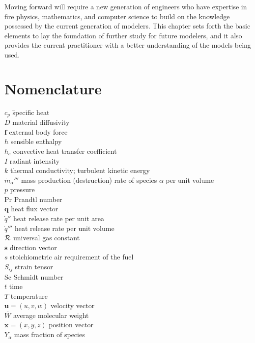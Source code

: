 \documentclass[graybox]{svmult}
\begin{document}
Moving forward will require a new generation of engineers who have expertise in fire physics, mathematics, and computer science to build on the knowledge possessed by the current generation of modelers. This chapter sets forth the basic elements to lay the foundation of further study for future modelers, and it also provides the current practitioner with a better understanding of the models being used.



\section{Nomenclature}

\begin{tabbing}
$c_p$ 	\hspace{1in}     \= specific heat \\
$D$	                     \> material diffusivity \\
$\mathbf{f}$	         \> external body force \\
$h$                      \>	sensible enthalpy \\
$h_c$ 	                 \> convective heat transfer coefficient \\
$I$	                     \> radiant intensity \\
$k$	                     \> thermal	conductivity; turbulent	kinetic energy \\
$\dot{m}_\alpha'''$      \> mass production (destruction) rate of species $\alpha$ per unit volume \\
$p$	                     \> pressure \\
Pr	                     \> Prandtl number \\
$\mathbf{q}$	         \> heat flux vector \\
$\dot{q}''$              \> heat release rate per unit area \\
$\dot{q}'''$             \> heat release rate per unit volume \\
$\cal R$                 \> universal gas constant \\
$\mathbf{s}$	         \> direction vector \\
$s$	                     \> stoichiometric air requirement of the fuel \\
$S_{ij}$ 	             \> strain tensor \\
Sc	                     \> Schmidt number \\
$t$	                     \> time \\
$T$	                     \> temperature \\
$\mathbf{u}=(u,v,w)$     \> velocity vector \\
$\overline{W}$	         \> average molecular weight \\
$\mathbf{x}=(x,y,z)$	 \> position vector \\
$Y_\alpha$               \> mass fraction of species
\end{tabbing}
\end{document}

